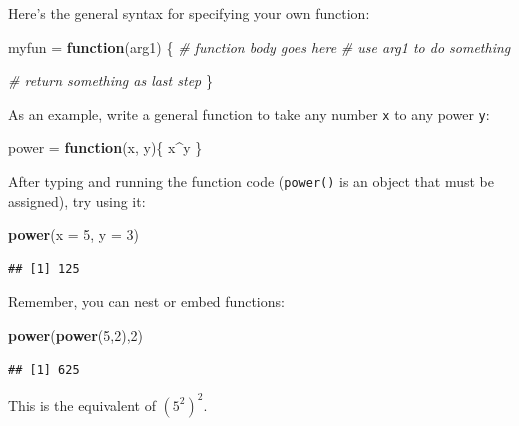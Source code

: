 \documentclass[]{book}
\newenvironment{Shaded}{\begin{snugshade}}{\end{snugshade}}
\newcommand{\KeywordTok}[1]{\textcolor[rgb]{0.13,0.29,0.53}{\textbf{#1}}}
\newcommand{\DataTypeTok}[1]{\textcolor[rgb]{0.13,0.29,0.53}{#1}}
\newcommand{\DecValTok}[1]{\textcolor[rgb]{0.00,0.00,0.81}{#1}}
\newcommand{\StringTok}[1]{\textcolor[rgb]{0.31,0.60,0.02}{#1}}
\newcommand{\CommentTok}[1]{\textcolor[rgb]{0.56,0.35,0.01}{\textit{#1}}}
\newcommand{\ControlFlowTok}[1]{\textcolor[rgb]{0.13,0.29,0.53}{\textbf{#1}}}
\newcommand{\OperatorTok}[1]{\textcolor[rgb]{0.81,0.36,0.00}{\textbf{#1}}}
\newcommand{\NormalTok}[1]{#1}
\theoremstyle{definition}
\theoremstyle{definition}
\theoremstyle{definition}
\theoremstyle{remark}
\begin{document}
Here's the general syntax for specifying your own function:

\begin{Shaded}
\begin{Highlighting}[]
\NormalTok{myfun =}\StringTok{ }\ControlFlowTok{function}\NormalTok{(arg1) \{}
  \CommentTok{# function body goes here}
    \CommentTok{# use arg1 to do something}
  
  \CommentTok{# return something as last step}
\NormalTok{\}}
\end{Highlighting}
\end{Shaded}

As an example, write a general function to take any number \texttt{x} to
any power \texttt{y}:

\begin{Shaded}
\begin{Highlighting}[]
\NormalTok{power =}\StringTok{ }\ControlFlowTok{function}\NormalTok{(x, y)\{}
\NormalTok{  x}\OperatorTok{^}\NormalTok{y}
\NormalTok{\}}
\end{Highlighting}
\end{Shaded}

After typing and running the function code (\texttt{power()} is an
object that must be assigned), try using it:

\begin{Shaded}
\begin{Highlighting}[]
\KeywordTok{power}\NormalTok{(}\DataTypeTok{x =} \DecValTok{5}\NormalTok{, }\DataTypeTok{y =} \DecValTok{3}\NormalTok{)}
\end{Highlighting}
\end{Shaded}

\begin{verbatim}
## [1] 125
\end{verbatim}

Remember, you can nest or embed functions:

\begin{Shaded}
\begin{Highlighting}[]
\KeywordTok{power}\NormalTok{(}\KeywordTok{power}\NormalTok{(}\DecValTok{5}\NormalTok{,}\DecValTok{2}\NormalTok{),}\DecValTok{2}\NormalTok{)}
\end{Highlighting}
\end{Shaded}

\begin{verbatim}
## [1] 625
\end{verbatim}

This is the equivalent of \((5^2)^2\).
\end{document}
